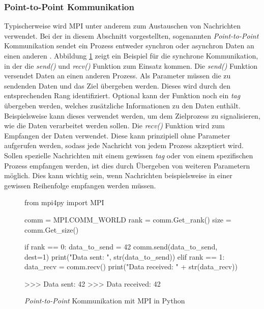 \subsubsection{Point-to-Point Kommunikation}
\label{subsubsec:point_to_point_communication}
Typischerweise wird \ac{MPI} unter anderem zum Austauschen von Nachrichten verwendet. Bei der in diesem Abschnitt vorgestellten, sogenannten \emph{Point-to-Point} Kommunikation sendet ein Prozess entweder synchron oder asynchron Daten an einen anderen \cite{nielsen2016introduction}. Abbildung \ref{fig:example_point_to_point} zeigt ein Beispiel für die synchrone Kommunikation, in der die \emph{send()} und \emph{recv()} Funktion zum Einsatz kommen. Die \emph{send()} Funktion versendet Daten an einen anderen Prozess. Als Parameter müssen die zu sendenden Daten und das Ziel übergeben werden. Dieses wird durch den entsprechenden Rang identifiziert. Optional kann der Funktion noch ein \emph{tag} übergeben werden, welches zusätzliche Informationen zu den Daten enthält. Beispielsweise kann dieses verwendet werden, um dem Zielprozess zu signalisieren, wie die Daten verarbeitet werden sollen. Die \emph{recv()} Funktion wird zum Empfangen der Daten verwendet. Diese kann prinzipiell ohne Parameter aufgerufen werden, sodass jede Nachricht von jedem Prozess akzeptiert wird. Sollen spezielle Nachrichten mit einem gewissen \emph{tag} oder von einem spezifischen Prozess empfangen werden, ist dies durch Übergeben von weiteren Parametern möglich. Dies kann wichtig sein, wenn Nachrichten beispielsweise in einer gewissen Reihenfolge empfangen werden müssen. 
\begin{figure}
	\begin{python}
		from mpi4py import MPI
		
		comm = MPI.COMM_WORLD
		rank = comm.Get_rank()
		size = comm.Get_size()
		
		if rank == 0:
			data_to_send = 42
			comm.send(data_to_send, dest=1)
			print("Data sent: ", str(data_to_send))
		elif rank == 1:
			data_recv = comm.recv()
			print("Data received: " + str(data_recv))
			
		>>> Data sent:  42
		>>> Data received: 42
	\end{python}
	\caption{\emph{Point-to-Point} Kommunikation mit MPI in Python}
	\label{fig:example_point_to_point}
\end{figure}
\\ \noindent
